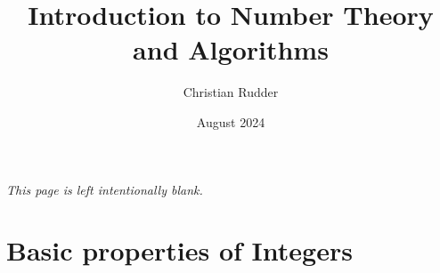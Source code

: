 \documentclass{memoir}
\title{Introduction to Number Theory and Algorithms}
\author{Christian Rudder}
\date{August 2024}
\begin{document}
\maketitle

\tableofcontents

\newpage
\thispagestyle{empty}
\mbox{}
\vfill
\begin{center}
    \textit{This page is left intentionally blank.}
\end{center}
\vfill
\newpage




\chapter{Basic properties of Integers}




\end{document}
